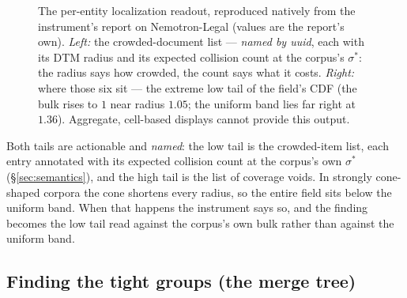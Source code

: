\documentclass[11pt,letterpaper]{article}
\newcommand{\sstar}{\sigma^{*}}
\begin{document}
\begin{figure}[t]
\begin{minipage}[c]{0.51\textwidth}
\end{minipage}
\caption{The per-entity localization readout, reproduced natively from the
instrument's report on Nemotron-Legal (values are the report's own).
\emph{Left:} the crowded-document list --- \emph{named by uuid}, each with
its DTM radius and its expected collision count at the corpus's
$\sstar$: the radius says how crowded, the count says what it costs.
\emph{Right:} where those six sit --- the extreme low tail of the field's
CDF (the bulk rises to $1$ near radius $1.05$; the uniform band lies far
right at $1.36$). Aggregate, cell-based displays cannot provide this output.}
\label{fig:dtmcard}
\end{figure} Both tails are actionable and \emph{named}: the low tail is the
crowded-item list, each entry annotated with its expected collision count
at the corpus's own $\sstar$ (\S\ref{sec:semantics}), and the high tail is
the list of coverage voids. In strongly cone-shaped corpora the cone
shortens every radius, so the entire field sits below the uniform band.
When that happens the instrument says so, and the finding becomes the
low tail read against the corpus's own bulk rather than against the
uniform band.

\subsection{Finding the tight groups (the merge tree)}
\label{sec:tree}
\end{document}
